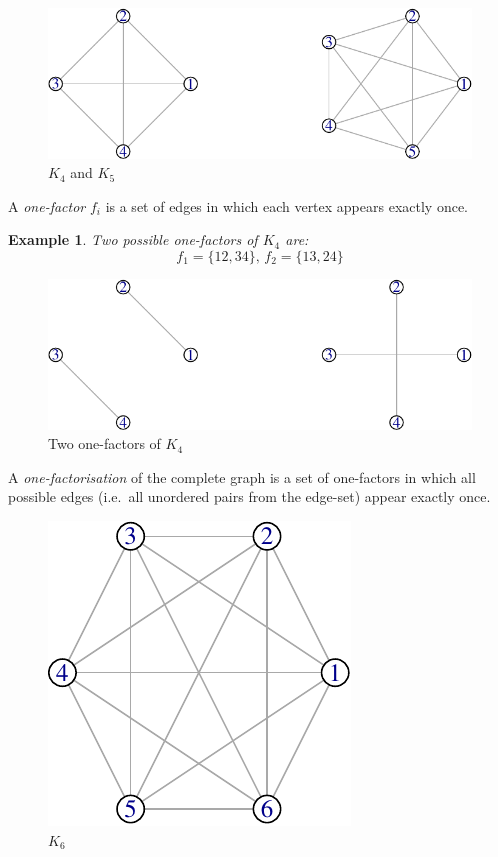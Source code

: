 \documentclass[
  11pt,
  a4paper]{book}
\newtheorem{example}{Example}
\begin{document}
\begin{figure}
\centering
\includegraphics{figure/complete-graph-1.pdf}
\caption{\label{fig:complete-graph}\(K_4\) and \(K_5\)}
\end{figure}

A
\emph{one-factor}
\(f_i\) is a set of edges in which each vertex appears
exactly once.

\begin{example}
Two possible one-factors of $K_4$ are:
$$f_1 = \{12,34\},\, f_2 = \{13,24\}$$
\end{example}

\begin{figure}
\centering
\includegraphics{figure/two-one-factors-1.pdf}
\caption{\label{fig:two-one-factors}Two one-factors of \(K_{4}\)}
\end{figure}

A \emph{one-factorisation} of the complete graph is a set of
one-factors in which all possible edges (i.e.~all unordered
pairs from the edge-set) appear exactly once.

\begin{figure}
\centering
\includegraphics{figure/K6-1.pdf}
\caption{\label{fig:K6}\(K_6\)}
\end{figure}
\end{document}
